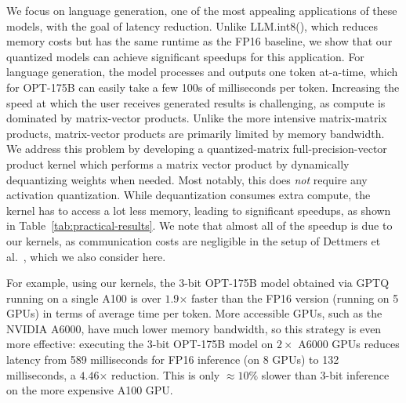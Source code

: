 We focus on language generation, one of the most appealing applications of these models, with the goal of latency reduction. 
Unlike LLM.int8(), which reduces memory costs but has the same runtime as the FP16 baseline, we show that our quantized models can achieve significant speedups for this application. 
For language generation, the model processes and outputs one token at-a-time, which for OPT-175B can easily take a few 100s of milliseconds per token. 
Increasing the speed at which the user receives generated results is challenging, as compute is dominated by matrix-vector products. 
Unlike the more intensive matrix-matrix products, matrix-vector products are primarily limited by memory bandwidth. 
We address this problem by developing a quantized-matrix full-precision-vector product kernel which performs a matrix vector product by dynamically dequantizing weights when needed. Most notably, this does \emph{not} require any activation quantization.
While dequantization consumes extra compute, the kernel has to access a lot less memory, leading to significant speedups, as shown in Table~\ref{tab:practical-results}. We note that almost all of the speedup is due to our kernels, as communication costs are negligible in the setup of Dettmers et al.~\cite{dettmers2022llm}, which we also consider here.

\begin{table}[h]
    \centering
    \vspace{5pt}
    \caption{Average per-token latency (batch size 1) when generating sequences of length 128.}
    \label{tab:practical-results}
\end{table}

For example, using our kernels, the 3-bit OPT-175B model obtained via GPTQ running on a single A100 is over $\mathbf{1.9\boldsymbol{\times}}$ faster than the FP16 version (running on 5 GPUs) in terms of average time per token. 
More accessible GPUs, such as the NVIDIA A6000, have much lower memory bandwidth, so this strategy is even more effective: executing the 3-bit OPT-175B model on $2\times$ A6000 GPUs reduces latency from 589 milliseconds for FP16 inference (on 8 GPUs) to 132 milliseconds, a $\mathbf{4.46\boldsymbol{\times}}$ reduction. This is only $\approx10\%$ slower than 3-bit inference on the more expensive A100 GPU.

